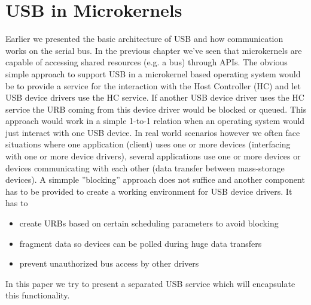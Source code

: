 \documentclass{acm_proc_article-sp}
\begin{document}
\section{USB in Microkernels}
\label{sec:both}
Earlier we presented the basic architecture of USB and how communication works on the serial bus.
In the previous chapter we've seen that microkernels are capable of accessing shared resources
(e.g. a bus) through APIs.
The obvious simple approach to support USB in a microkernel based operating system would be to provide
a service for the interaction with the Host Controller (HC) and let USB device drivers use the HC service.
If another USB device driver uses the HC service the URB coming from this device driver would be
blocked or queued.
This approach would work in a simple 1-to-1 relation when an operating system would just interact
with one USB device.
In real world scenarios however we often face situations where one application (client) uses one or more
devices (interfacing with one or more device drivers), several applications use one or more devices or
devices communicating with each other (data transfer between mass-storage devices).
A simmple ''blocking'' approach does not suffice and another component has to be provided to create a working
environment for USB device drivers.
It has to
\begin{itemize}
\item create URBs based on certain scheduling parameters to avoid blocking
\item fragment data so devices can be polled during huge data transfers
\item prevent unauthorized bus access by other drivers
\end{itemize}
In this paper we try to present a separated USB service which will encapsulate this functionality.
\end{document}
